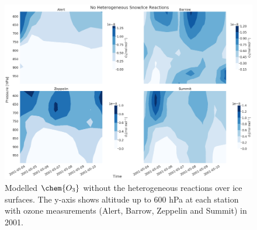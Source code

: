 \begin{figure}
    \centering
    \includegraphics[width = \linewidth]{Chapter6_Results/images/noSnowIce_2001_o3.png}
    \caption{Modelled $\chem{O_3}$ without the heterogeneous reactions over ice surfaces. The y-axis shows altitude up to 600 hPa at each station with ozone measurements (Alert, Barrow, Zeppelin and Summit) in 2001.}
    \label{fig:vert_noSnowIce_o3_2001}
\end{figure}